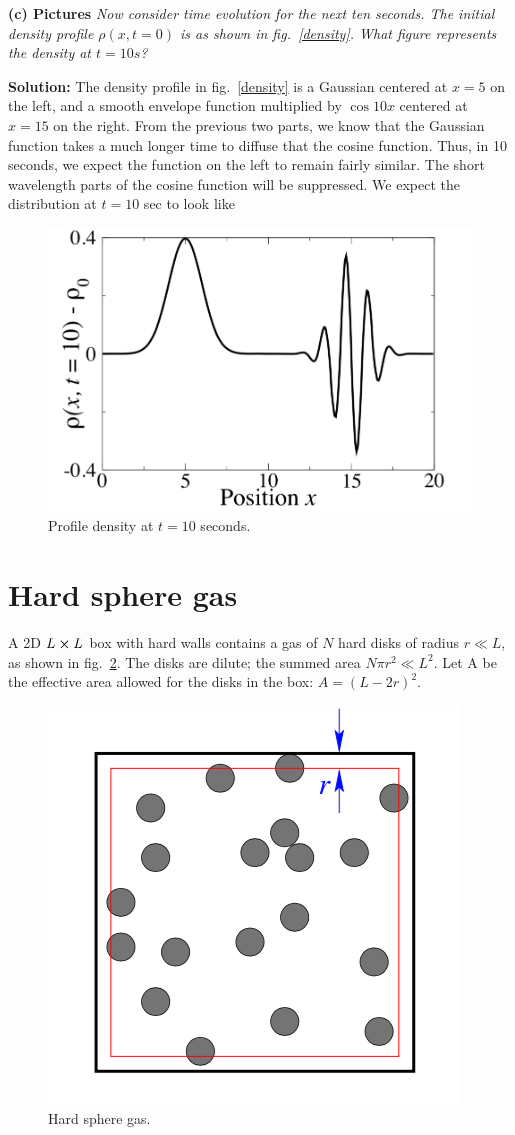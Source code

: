 \documentclass[11pt]{article}
\begin{document}
\vspace{2mm}
\noindent
\textbf{(c) Pictures}
\textit{Now consider time evolution for the next ten seconds. The initial density profile $\rho(x,t = 0)$ is as shown in fig.~\ref{density}.
What figure represents the density at $t = 10s$?}



\vspace{2mm}
\noindent
\textbf{Solution:}
The density profile in fig.~\ref{density} is a Gaussian centered at $x=5$ on the left,
and a smooth envelope function multiplied by $\cos{10x}$ centered at $x=15$ on the right. From the previous two parts, we know that the Gaussian function takes a much longer time to diffuse that the cosine function. Thus, in 10 seconds, we expect the function on the left to remain fairly similar. The short wavelength parts of the cosine function will be suppressed.
We expect the distribution at $t = 10$ sec to look like 

\begin{figure}[h!]
\centering
\includegraphics[width=.4\linewidth]{PSet2_Fig3}
\caption{Profile density at $t = 10$ seconds.}
\label{10sec}
\end{figure}

\section{Hard sphere gas}
A 2D $L \cross L$ box with hard walls contains a gas of $N$ hard disks of radius $r \ll L$, as shown in fig.~\ref{sphere}.
The disks are dilute; the summed area $N\pi r^2 \ll L^2$.
Let A be the effective area allowed for the disks in the box: $A = (L-2r)^2$.
\begin{figure}[h!]
	\centering
	\includegraphics[width=.3\linewidth]{PSet2_Fig2}
	\caption{Hard sphere gas.}
	\label{sphere}
\end{figure}
\end{document}

